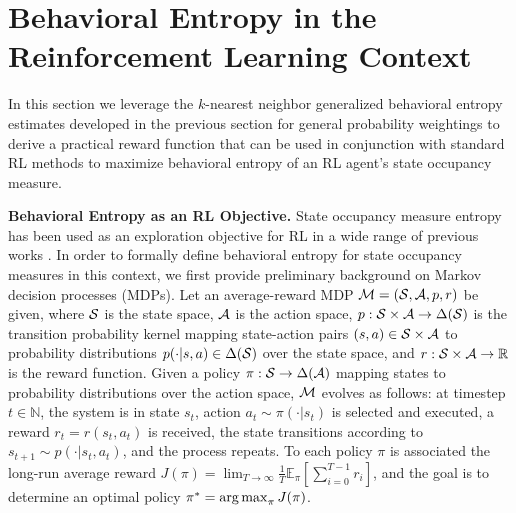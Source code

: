 \section{Behavioral Entropy in the Reinforcement Learning Context}

In this section we leverage the $k$-nearest neighbor generalized behavioral entropy estimates developed in the previous section for general probability weightings to derive a practical reward function that can be used in conjunction with standard RL methods to maximize behavioral entropy of an RL agent's state occupancy measure.



\textbf{Behavioral Entropy as an RL Objective.} State occupancy measure entropy has been used as an exploration objective for RL in a wide range of previous works \citep{hazan2019provably, liu2021behavior, yarats2021reinforcement, zhang2021exploration, yuan2022renyi}. In order to formally define behavioral entropy for state occupancy measures in this context, we first provide preliminary background on Markov decision processes (MDPs).
%
Let an average-reward MDP $\mathcal{M} = (\mathcal{S}, \mathcal{A}, p, r)$ be given, where $\mathcal{S}$ is the state space, $\mathcal{A}$ is the action space, $p: \mathcal{S} \times \mathcal{A} \rightarrow \Delta(\mathcal{S})$ is the transition probability kernel mapping state-action pairs $(s, a) \in \mathcal{S} \times \mathcal{A}$ to probability distributions $p(\cdot | s, a) \in \Delta(\mathcal{S})$ over the state space, and $r : \mathcal{S} \times \mathcal{A} \rightarrow \mathbb{R}$ is the reward function. Given a policy $\pi : \mathcal{S} \rightarrow \Delta(\mathcal{A})$ mapping states to probability distributions over the action space, $\mathcal{M}$ evolves as follows: at timestep $t \in \mathbb{N}$, the system is in state $s_t$, action $a_t \sim \pi(\cdot | s_t)$ is selected and executed, a reward $r_t = r(s_t, a_t)$ is received, the state transitions according to $s_{t+1} \sim p(\cdot | s_t, a_t)$, and the process repeats. To each policy $\pi$ is associated the long-run average reward $J(\pi) = \lim_{T \rightarrow \infty} \frac{1}{T} \mathbb{E}_{\pi} [ \sum_{i=0}^{T-1} r_i ]$, and the goal is to determine an optimal policy $\pi^* = \operatorname*{arg\,max}_{\pi} J(\pi)$.

